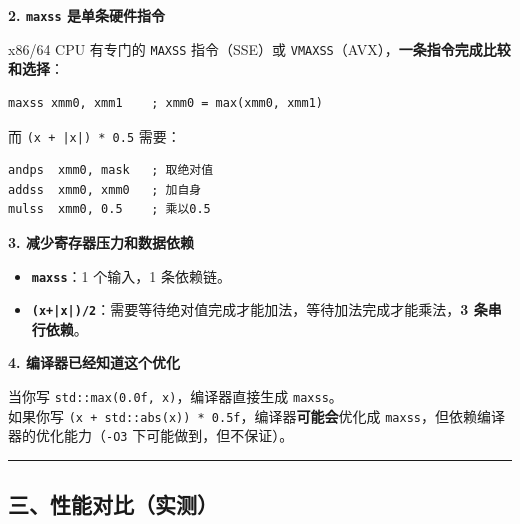 \documentclass[11pt, a4paper]{article}
\begin{document}
\begin{aibox}
\vspace{0.5em}
\textbf{2. \texttt{maxss} 是单条硬件指令}

x86/64 CPU 有专门的 \texttt{MAXSS} 指令（SSE）或 \texttt{VMAXSS}（AVX），\textbf{一条指令完成比较和选择}：

\begin{tcolorbox}[colback=white,colframe=gray!50!white,boxrule=0.5pt,arc=2pt,left=5pt,right=5pt,top=5pt,bottom=5pt]
\begin{verbatim}
maxss xmm0, xmm1    ; xmm0 = max(xmm0, xmm1)
\end{verbatim}
\end{tcolorbox}

而 \texttt{(x + |x|) * 0.5} 需要：

\begin{tcolorbox}[colback=white,colframe=gray!50!white,boxrule=0.5pt,arc=2pt,left=5pt,right=5pt,top=5pt,bottom=5pt]
\begin{verbatim}
andps  xmm0, mask   ; 取绝对值
addss  xmm0, xmm0   ; 加自身
mulss  xmm0, 0.5    ; 乘以0.5
\end{verbatim}
\end{tcolorbox}

\vspace{0.5em}
\textbf{3. 减少寄存器压力和数据依赖}

\begin{itemize}
    \item \textbf{\texttt{maxss}}：1 个输入，1 条依赖链。
    \item \textbf{\texttt{(x+|x|)/2}}：需要等待绝对值完成才能加法，等待加法完成才能乘法，\textbf{3 条串行依赖}。
\end{itemize}

\vspace{0.5em}
\textbf{4. 编译器已经知道这个优化}

当你写 \texttt{std::max(0.0f, x)}，编译器直接生成 \texttt{maxss}。\\
如果你写 \texttt{(x + std::abs(x)) * 0.5f}，编译器\textbf{可能会}优化成 \texttt{maxss}，但依赖编译器的优化能力（\texttt{-O3} 下可能做到，但不保证）。

\begin{center}\rule{\textwidth}{0.4pt}\end{center}

\subsection*{三、性能对比（实测）}


\end{aibox}
\end{document}
